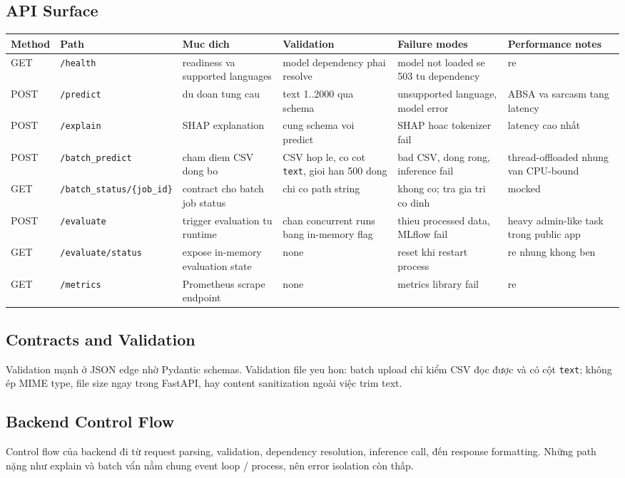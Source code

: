 \subsection{API Surface}
\begin{longtable}{@{}p{}p{}p{}p{}p{}p{}@{}}
\toprule
\textbf{Method} & \textbf{Path} & \textbf{Muc dich} & \textbf{Validation} & \textbf{Failure modes} & \textbf{Performance notes} \\
\midrule
\endhead
GET & \texttt{/health} & readiness va supported languages & model dependency phai resolve & model not loaded se 503 tu dependency & re \\
POST & \texttt{/predict} & du doan tung cau & text 1..2000 qua schema & unsupported language, model error & ABSA va sarcasm tang latency \\
POST & \texttt{/explain} & SHAP explanation & cung schema voi predict & SHAP hoac tokenizer fail & latency cao nhất \\
POST & \texttt{/batch\_predict} & cham diem CSV dong bo & CSV hop le, co cot \texttt{text}, gioi han 500 dong & bad CSV, dong rong, inference fail & thread-offloaded nhung van CPU-bound \\
GET & \texttt{/batch\_status/\{job\_id\}} & contract cho batch job status & chi co path string & khong co; tra gia tri co dinh & mocked \\
POST & \texttt{/evaluate} & trigger evaluation tu runtime & chan concurrent runs bang in-memory flag & thieu processed data, MLflow fail & heavy admin-like task trong public app \\
GET & \texttt{/evaluate/status} & expose in-memory evaluation state & none & reset khi restart process & re nhung khong ben \\
GET & \texttt{/metrics} & Prometheus scrape endpoint & none & metrics library fail & re \\
\bottomrule
\end{longtable}

\subsection{Contracts and Validation}
Validation mạnh ở JSON edge nhờ Pydantic schemas. Validation file yeu hon: batch upload chỉ kiểm CSV đọc được và có cột \texttt{text}; không ép MIME type, file size ngay trong FastAPI, hay content sanitization ngoài việc trim text.

\subsection{Backend Control Flow}
Control flow của backend đi từ request parsing, validation, dependency resolution, inference call, đến response formatting. Những path nặng như explain và batch vẩn nằm chung event loop / process, nên error isolation còn thấp.

